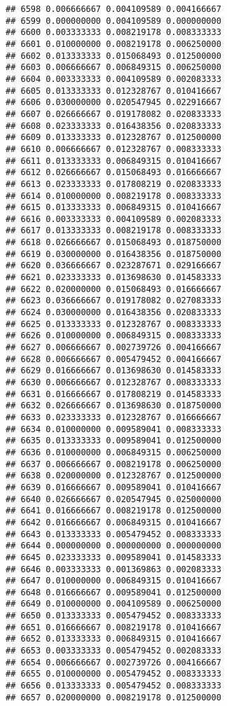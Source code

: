 \documentclass[
]{article}
\begin{document}
\begin{verbatim}
## 6598 0.006666667 0.004109589 0.004166667
## 6599 0.000000000 0.004109589 0.000000000
## 6600 0.003333333 0.008219178 0.008333333
## 6601 0.010000000 0.008219178 0.006250000
## 6602 0.013333333 0.015068493 0.012500000
## 6603 0.006666667 0.006849315 0.006250000
## 6604 0.003333333 0.004109589 0.002083333
## 6605 0.013333333 0.012328767 0.010416667
## 6606 0.030000000 0.020547945 0.022916667
## 6607 0.026666667 0.019178082 0.020833333
## 6608 0.023333333 0.016438356 0.020833333
## 6609 0.013333333 0.012328767 0.012500000
## 6610 0.006666667 0.012328767 0.008333333
## 6611 0.013333333 0.006849315 0.010416667
## 6612 0.026666667 0.015068493 0.016666667
## 6613 0.023333333 0.017808219 0.020833333
## 6614 0.010000000 0.008219178 0.008333333
## 6615 0.013333333 0.006849315 0.010416667
## 6616 0.003333333 0.004109589 0.002083333
## 6617 0.013333333 0.008219178 0.008333333
## 6618 0.026666667 0.015068493 0.018750000
## 6619 0.030000000 0.016438356 0.018750000
## 6620 0.036666667 0.023287671 0.029166667
## 6621 0.023333333 0.013698630 0.014583333
## 6622 0.020000000 0.015068493 0.016666667
## 6623 0.036666667 0.019178082 0.027083333
## 6624 0.030000000 0.016438356 0.020833333
## 6625 0.013333333 0.012328767 0.008333333
## 6626 0.010000000 0.006849315 0.008333333
## 6627 0.006666667 0.002739726 0.004166667
## 6628 0.006666667 0.005479452 0.004166667
## 6629 0.016666667 0.013698630 0.014583333
## 6630 0.006666667 0.012328767 0.008333333
## 6631 0.016666667 0.017808219 0.014583333
## 6632 0.026666667 0.013698630 0.018750000
## 6633 0.023333333 0.012328767 0.016666667
## 6634 0.010000000 0.009589041 0.008333333
## 6635 0.013333333 0.009589041 0.012500000
## 6636 0.010000000 0.006849315 0.006250000
## 6637 0.006666667 0.008219178 0.006250000
## 6638 0.020000000 0.012328767 0.012500000
## 6639 0.016666667 0.009589041 0.010416667
## 6640 0.026666667 0.020547945 0.025000000
## 6641 0.016666667 0.008219178 0.012500000
## 6642 0.016666667 0.006849315 0.010416667
## 6643 0.013333333 0.005479452 0.008333333
## 6644 0.000000000 0.000000000 0.000000000
## 6645 0.023333333 0.009589041 0.014583333
## 6646 0.003333333 0.001369863 0.002083333
## 6647 0.010000000 0.006849315 0.010416667
## 6648 0.016666667 0.009589041 0.012500000
## 6649 0.010000000 0.004109589 0.006250000
## 6650 0.013333333 0.005479452 0.008333333
## 6651 0.016666667 0.008219178 0.010416667
## 6652 0.013333333 0.006849315 0.010416667
## 6653 0.003333333 0.005479452 0.002083333
## 6654 0.006666667 0.002739726 0.004166667
## 6655 0.010000000 0.005479452 0.008333333
## 6656 0.013333333 0.005479452 0.008333333
## 6657 0.020000000 0.008219178 0.012500000

\end{verbatim}
\end{document}
